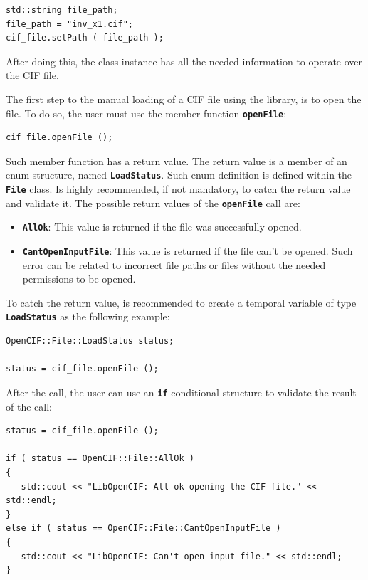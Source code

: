 \documentclass[11pt,twoside,openany,x11names,svgnames]{memoir}
\begin{document}
\begin{lstlisting}[frame=single,style=CPPStyle]
std::string file_path;
file_path = "inv_x1.cif";
cif_file.setPath ( file_path );
\end{lstlisting}

After doing this, the class instance has all the needed information to operate over the CIF file.

The first step to the manual loading of a CIF file using the library, is to open the file. To do so, the user must use the member function \textbf{\texttt{openFile}}:

\begin{lstlisting}[frame=single,style=CPPStyle]
cif_file.openFile ();
\end{lstlisting}

Such member function has a return value. The return value is a member of an enum structure, named \textbf{\texttt{LoadStatus}}. Such enum definition is defined within the \textbf{\texttt{File}} class. Is highly recommended, if not mandatory, to catch the return value and validate it. The possible return values of the \textbf{\texttt{openFile}} call are:

\begin{itemize}
	\item \textbf{\texttt{AllOk}}: This value is returned if the file was successfully opened.
	
	\item \textbf{\texttt{CantOpenInputFile}}: This value is returned if the file can't be opened. Such error can be related to incorrect file paths or files without the needed permissions to be opened.
\end{itemize}

To catch the return value, is recommended to create a temporal variable of type \textbf{\texttt{LoadStatus}} as the following example:

\begin{lstlisting}[frame=single,style=CPPStyle]
OpenCIF::File::LoadStatus status;

status = cif_file.openFile ();
\end{lstlisting}

After the call, the user can use an \textbf{\texttt{if}} conditional structure to validate the result of the call:

\begin{lstlisting}[frame=single,style=CPPStyle]
status = cif_file.openFile ();
   
if ( status == OpenCIF::File::AllOk )
{
   std::cout << "LibOpenCIF: All ok opening the CIF file." << std::endl;
}
else if ( status == OpenCIF::File::CantOpenInputFile )
{
   std::cout << "LibOpenCIF: Can't open input file." << std::endl;
}
\end{lstlisting}
\end{document}
